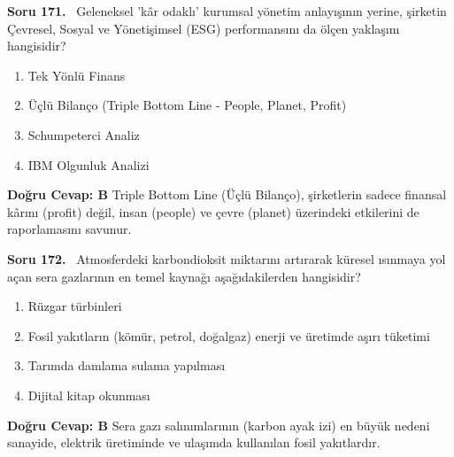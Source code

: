 \documentclass[11pt,a4paper,openany]{book}
\begin{document}
\needspace{5cm}
\vspace{8pt}
\noindent\textbf{\large\sffamily Soru 171.} \ Geleneksel 'kâr odaklı' kurumsal yönetim anlayışının yerine, şirketin Çevresel, Sosyal ve Yönetişimsel (ESG) performansını da ölçen yaklaşım hangisidir?
\begin{enumerate}[label=\Alph*), leftmargin=25pt, topsep=4pt, itemsep=2pt]
    \item Tek Yönlü Finans
    \item Üçlü Bilanço (Triple Bottom Line - People, Planet, Profit)
    \item Schumpeterci Analiz
    \item IBM Olgunluk Analizi
\end{enumerate}
\vspace{4pt}
\begin{tcolorbox}[title=Cevap ve Açıklama, colback=gray!3!white, colframe=primarycolor!90!black, arc=2mm, fonttitle=\bfseries\sffamily, top=6pt, bottom=6pt]
    \textbf{Doğru Cevap: B}
    \vspace{2pt}
    Triple Bottom Line (Üçlü Bilanço), şirketlerin sadece finansal kârını (profit) değil, insan (people) ve çevre (planet) üzerindeki etkilerini de raporlamasını savunur.
\end{tcolorbox}
\vspace{10pt}

\needspace{5cm}
\vspace{8pt}
\noindent\textbf{\large\sffamily Soru 172.} \ Atmosferdeki karbondioksit miktarını artırarak küresel ısınmaya yol açan sera gazlarının en temel kaynağı aşağıdakilerden hangisidir?
\begin{enumerate}[label=\Alph*), leftmargin=25pt, topsep=4pt, itemsep=2pt]
    \item Rüzgar türbinleri
    \item Fosil yakıtların (kömür, petrol, doğalgaz) enerji ve üretimde aşırı tüketimi
    \item Tarımda damlama sulama yapılması
    \item Dijital kitap okunması
\end{enumerate}
\vspace{4pt}
\begin{tcolorbox}[title=Cevap ve Açıklama, colback=gray!3!white, colframe=primarycolor!90!black, arc=2mm, fonttitle=\bfseries\sffamily, top=6pt, bottom=6pt]
    \textbf{Doğru Cevap: B}
    \vspace{2pt}
    Sera gazı salınımlarının (karbon ayak izi) en büyük nedeni sanayide, elektrik üretiminde ve ulaşımda kullanılan fosil yakıtlardır.
\end{tcolorbox}
\vspace{10pt}
\end{document}

